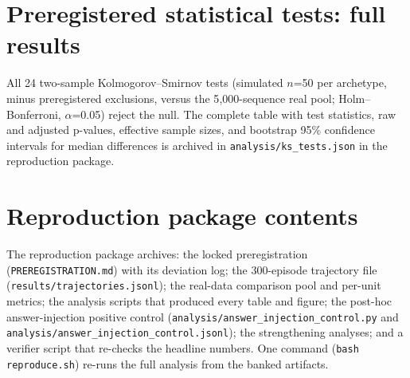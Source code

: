 \documentclass[notitlepage,12pt]{jedm}
\begin{document}
\appendix

\section{Preregistered statistical tests: full results}

All 24 two-sample Kolmogorov--Smirnov tests (simulated $n$=50 per archetype,
minus preregistered exclusions, versus the 5{,}000-sequence real pool;
Holm--Bonferroni, $\alpha$=0.05) reject the null. The complete table with
test statistics, raw and adjusted p-values, effective sample sizes, and
bootstrap 95\% confidence intervals for median differences is archived in
\texttt{analysis/ks\_tests.json} in the reproduction package.

\section{Reproduction package contents}

The reproduction package archives: the locked preregistration
(\texttt{PREREGISTRATION.md}) with its deviation log; the 300-episode
trajectory file (\texttt{results/trajectories.jsonl}); the real-data
comparison pool and per-unit metrics; the analysis scripts that produced
every table and figure; the post-hoc answer-injection positive control
(\texttt{analysis/answer\_injection\_control.py} and
\texttt{analysis/answer\_injection\_control.jsonl}); the strengthening
analyses; and a verifier script
that re-checks the headline numbers. One command (\texttt{bash
reproduce.sh}) re-runs the full analysis from the banked artifacts.
\end{document}
